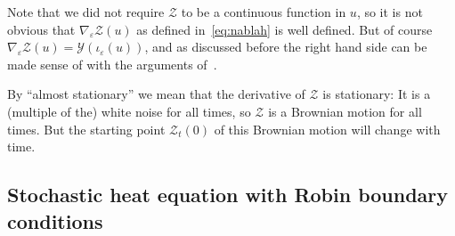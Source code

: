 \documentclass[AHL,Unicode,longabstracts]{cedram}
\newcommand{\mc}[1]{{\mathcal #1}}
\renewcommand{\mc}[1]{{\mathcal #1}}
\begin{document}
\begin{rema}
Note that we did not require $\mc Z$ to be a continuous function in $u$, so it is not obvious that $\nabla_\varepsilon \mc Z(u)$ as defined in~\eqref{eq:nablah} is well defined. But of course $\nabla_\varepsilon \mc Z(u) = \mc Y(\iota_\varepsilon(u))$, and as discussed before the right hand side can be made sense of with the arguments of~\cite[Remark~4]{gj2014}.
\end{rema}

\begin{rema}
By ``almost stationary'' we mean that the derivative of $\mc Z$ is stationary: It is a (multiple of the) white noise for all times, so $\mc Z$ is a Brownian motion for all times. But the starting point $\mc Z_t(0)$ of this Brownian motion will change with time.
\end{rema}

\subsection{Stochastic heat equation with Robin boundary conditions}\label{app:she}
\end{document}
